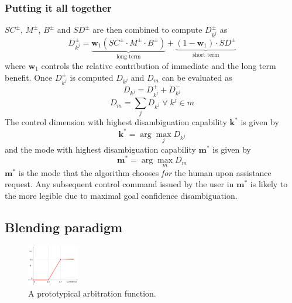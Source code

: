 \documentclass[conference]{IEEEtran}
\newcommand{\argmax}{\arg\!\max}
\begin{document}
\subsubsection*{Putting it all together}
$SC^{\pm}$, $M^{\pm}$, $B^{\pm}$ and $SD^{\pm}$ are then combined to compute $D_{k^j}^{\pm}$ as 
\begin{equation*}
D_{k^j}^{\pm} = \underbrace{\boldsymbol{w}_1(SC^{\pm}\cdot M^{\pm} \cdot B^{\pm})}_{\text{long term}} + \underbrace{(1 - \boldsymbol{w}_1)\cdot SD^{\pm}}_{\text{short term}}
\end{equation*}
where $\boldsymbol{w}_1$ controls the relative contribution of immediate and the long term benefit. 
Once $D_{k^j}^{\pm}$ is computed $D_{k^j}$ and $D_m$ can be evaluated as 
\begin{equation*}
D_{k^j} = D_{k^j}^{+} + D_{k^j}^{-}
\end{equation*}
\begin{equation*}
D_m = \sum_{j} D_{k^j} \; \forall \; k^j \in m
\end{equation*}
The control dimension with highest disambiguation capability $\boldsymbol{k}^*$ is given by
\begin{equation*}
\boldsymbol{k}^* = \argmax_j D_{k^j}
\end{equation*}
 and the mode with highest disambiguation capability $\boldsymbol{m}^{*}$ is given by
\begin{equation*}
\boldsymbol{m}^* = \argmax_m D_m
\end{equation*}
$\boldsymbol{m}^{*}$ is the mode that the algorithm chooses \textit{for} the human upon assistance request. Any subsequent control command issued by the user in $\boldsymbol{m}^*$ is likely to the more legible due to maximal goal confidence disambiguation.

\subsection{Blending paradigm}\label{BP}
\begin{figure}
	\begin{center}
		\vspace{-0.9cm}
		\includegraphics[width=0.2\textwidth]{./figures/ArbFunc.png}
	\end{center}
		\vspace{-.45cm}
	\caption{A prototypical arbitration function.}
	\label{ALPHA}
\end{figure}
\end{document}
